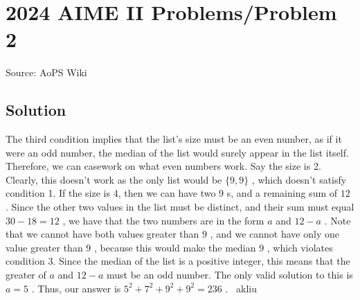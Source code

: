 \documentclass[12pt]{article}
\begin{document}
\section*{{2024 AIME II Problems/Problem 2}}
Source: AoPS Wiki

\subsection*{Solution}
The third condition implies that the list's size must be an even number, as if it were an odd number, the median of the list would surely appear in the list itself. Therefore, we can casework on what even numbers work. Say the size is 2. Clearly, this doesn't work as the only list would be $\{9, 9\}$ , which doesn't satisfy condition 1. If the size is 4, then we can have two $9$ s, and a remaining sum of $12$ . Since the other two values in the list must be distinct, and their sum must equal $30-18=12$ , we have that the two numbers are in the form $a$ and $12-a$ . Note that we cannot have both values greater than $9$ , and we cannot have only one value greater than $9$ , because this would make the median $9$ , which violates condition 3. Since the median of the list is a positive integer, this means that the greater of $a$ and $12-a$ must be an odd number. The only valid solution to this is $a=5$ . Thus, our answer is $5^2+7^2+9^2+9^2 = \boxed{236}$ . ~akliu
\end{document}
